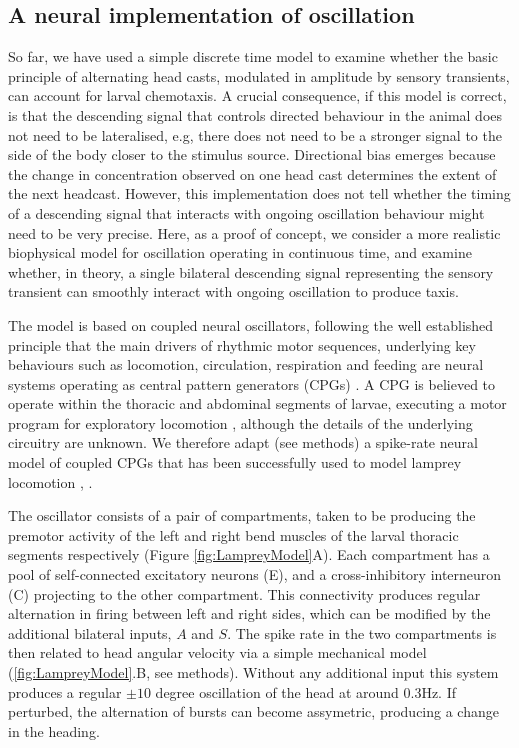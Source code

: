 \documentclass[10pt,a4paper]{article}
\begin{document}
\subsection{A neural implementation of oscillation}
So far, we have used a simple discrete time model to examine whether the basic principle of alternating head casts, modulated in amplitude by sensory transients, can account for larval chemotaxis. A crucial consequence, if this model is correct, is that the descending signal that controls directed behaviour in the animal does not need to be lateralised, e.g, there does not need to be a stronger signal to the side of the body closer to the stimulus source. Directional bias emerges because the change in concentration observed on one head cast determines the extent of the next headcast. 
However, this implementation does not tell whether the timing of a descending signal that interacts with ongoing oscillation behaviour might need to be very precise. 
%
Here, as a proof of concept, we consider a more realistic biophysical model for oscillation operating in continuous time, and examine whether, in theory, a single bilateral descending signal representing the sensory transient can smoothly interact with ongoing oscillation to produce taxis.


The model is based on coupled neural oscillators, following the well established principle that the main drivers of rhythmic  motor sequences, underlying key behaviours such as locomotion, circulation, respiration and feeding are neural systems operating as central pattern generators (CPGs) \citep{delcomyn1980neural}. A CPG is believed to operate  within the thoracic and abdominal segments of larvae, executing a motor program for exploratory locomotion \citep{berni2012autonomous,lemon2015whole}, although the details of the underlying circuitry are unknown. We therefore adapt (see methods) a spike-rate neural model of coupled CPGs that has been successfully used to model lamprey locomotion \citep{cohen1992modelling,lansner1997realistic}, \cite[see][]{marder1996principles}.


The oscillator consists of a pair of compartments, taken to be producing the premotor activity of the left and right bend muscles of the larval thoracic  segments respectively (Figure \ref{fig:LampreyModel}A). Each compartment has a pool of self-connected excitatory neurons (E), and a cross-inhibitory interneuron (C) projecting to the other compartment. This connectivity produces regular alternation in firing between left and right sides, which can be modified by the additional bilateral inputs, $A$ and $S$. The spike rate in the two compartments is then related to head angular velocity via a simple mechanical model (\ref{fig:LampreyModel}.B, see methods). Without any additional input this system produces a regular $\pm 10$ degree oscillation of the head at around 0.3Hz. If perturbed, the alternation of bursts can become assymetric, producing a change in the heading. 
\end{document}
